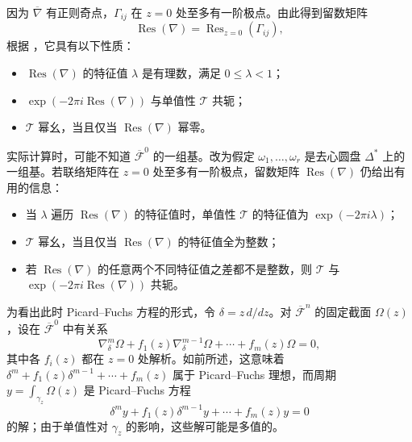 因为 $\overline\nabla$ 有正则奇点，$\Gamma_{ij}$ 在 $z=0$ 处至多有一阶极点。由此得到留数矩阵
\begin{equation}\label{eq:connection-residue}
\operatorname{Res}(\nabla)=\operatorname{Res}_{z=0}(\Gamma_{ij}),
\end{equation}
根据 ，它具有以下性质：
\begin{itemize}
\item $\operatorname{Res}(\nabla)$ 的特征值 $\lambda$ 是有理数，满足 $0\leq\lambda<1$；
\item $\exp(-2\pi i\operatorname{Res}(\nabla))$ 与单值性 $\mathcal T$ 共轭；
\item $\mathcal T$ 幂幺，当且仅当 $\operatorname{Res}(\nabla)$ 幂零。
\end{itemize}
实际计算时，可能不知道 $\overline{\mathcal F}^0$ 的一组基。改为假定 $\omega_1,\ldots,\omega_r$ 是去心圆盘 $\Delta^*$ 上的一组基。若联络矩阵在 $z=0$ 处至多有一阶极点，留数矩阵 $\operatorname{Res}(\nabla)$ 仍给出有用的信息：
\begin{itemize}
\item 当 $\lambda$ 遍历 $\operatorname{Res}(\nabla)$ 的特征值时，单值性 $\mathcal T$ 的特征值为 $\exp(-2\pi i\lambda)$；
\item $\mathcal T$ 幂幺，当且仅当 $\operatorname{Res}(\nabla)$ 的特征值全为整数；
\item 若 $\operatorname{Res}(\nabla)$ 的任意两个不同特征值之差都不是整数，则 $\mathcal T$ 与 $\exp(-2\pi i\operatorname{Res}(\nabla))$ 共轭。
\end{itemize}

为看出此时 Picard--Fuchs 方程的形式，令 $\delta=z\,d/dz$。对 $\overline{\mathcal F}^n$ 的固定截面 $\Omega(z)$，设在 $\overline{\mathcal F}^0$ 中有关系
\[
\nabla_\delta^m\Omega+f_1(z)\nabla_\delta^{m-1}\Omega
+\cdots+f_m(z)\Omega=0,
\]
其中各 $f_i(z)$ 都在 $z=0$ 处解析。如前所述，这意味着 $\delta^m+f_1(z)\delta^{m-1}+\cdots+f_m(z)$ 属于 Picard--Fuchs 理想，而周期 $y=\int_{\gamma_z}\Omega(z)$ 是 Picard--Fuchs 方程
\begin{equation}\label{eq:regular-pf-equation}
\delta^my+f_1(z)\delta^{m-1}y+\cdots+f_m(z)y=0
\end{equation}
的解；由于单值性对 $\gamma_z$ 的影响，这些解可能是多值的。

